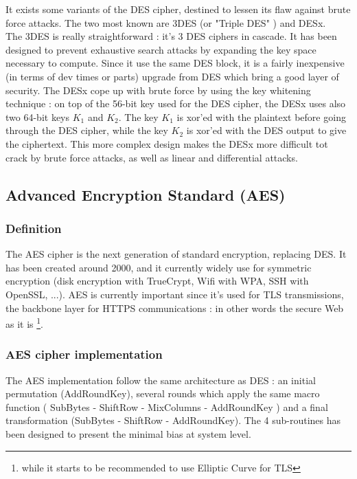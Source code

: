 It exists some variants of the DES cipher, destined to lessen its flaw against brute force attacks. The two most known are 3DES (or "Triple DES" ) and DESx. \\
The 3DES is really straightforward : it's 3 DES ciphers in cascade. It has been designed to prevent exhaustive search attacks by expanding the key space necessary to compute. Since it use the same DES block, it is a fairly inexpensive (in terms of dev times or parts) upgrade from DES which bring a good layer of security.
The DESx cope up with brute force by using the key whitening technique : on top of the 56-bit key used for the DES cipher, the DESx uses also two 64-bit keys $K_1$ and $K_2$. The key $K_1$ is xor'ed with the plaintext before going through the DES cipher, while the key $K_2$ is xor'ed with the DES output to give the ciphertext. This more complex design makes the DESx more difficult tot crack by brute force attacks, as well as linear and differential attacks.

\subsection{Advanced Encryption Standard (AES)}

\subsubsection{Definition}

The AES cipher is the next generation of standard encryption, replacing DES. It has been created around 2000, and it currently widely use for symmetric encryption (disk encryption with TrueCrypt, Wifi with WPA, SSH with OpenSSL, ...). AES is currently important since it's used for TLS transmissions, the backbone layer for HTTPS communications : in other words the secure Web as it is \footnote{while it starts to be recommended to use Elliptic Curve for TLS}.

\subsubsection{ AES cipher implementation }

The AES implementation follow the same architecture as DES : an initial permutation (AddRoundKey), several rounds which apply the same macro function ( SubBytes - ShiftRow - MixColumns - AddRoundKey ) and a final transformation (SubBytes - ShiftRow - AddRoundKey). The 4 sub-routines has been designed to present the minimal bias at system level.

